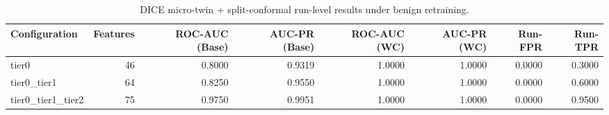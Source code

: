 \begin{table}[t]
\centering
\caption{DICE micro-twin + split-conformal run-level results under benign retraining.}
\label{tab:dice_full_overall}
\footnotesize
\begin{tabular}{lrrrrrrr}
\toprule
Configuration & Features & ROC-AUC (Base) & AUC-PR (Base) & ROC-AUC (WC) & AUC-PR (WC) & Run-FPR & Run-TPR \\
\midrule
tier0 & 46 & 0.8000 & 0.9319 & 1.0000 & 1.0000 & 0.0000 & 0.3000 \\
tier0_tier1 & 64 & 0.8250 & 0.9550 & 1.0000 & 1.0000 & 0.0000 & 0.6000 \\
tier0_tier1_tier2 & 75 & 0.9750 & 0.9951 & 1.0000 & 1.0000 & 0.0000 & 0.9500 \\
\bottomrule
\end{tabular}

\end{table}
